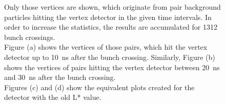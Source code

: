 \begin{figure}
{   Only those vertices are shown, which originate from pair background particles hitting the \sid vertex detector in the given time intervals.
   In order to increase the statistics, the results are accumulated for 1312 bunch crossings.
   \\Figure (a) shows the vertices of those pairs, which hit the vertex detector up to \SI[detect-all]{10}{\nano\second} after the bunch crossing.
   Similarly, Figure (b) shows the vertices of pairs hitting the vertex detector between \SI[detect-all]{20}{\nano\second} and \SI[detect-all]{30}{\nano\second} after the bunch crossing.
   \\Figures (c) and (d) show the equivalent plots created for the \sid detector with the old L* value.
   }
   \label{fig:PairBkg:Origins_Map}
 \end{figure}
 
